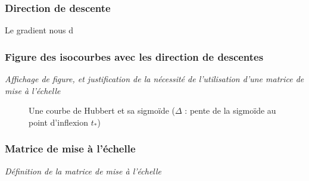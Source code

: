\documentclass{article}
\begin{document}
\subsubsection{Direction de descente}
Le gradient nous d



\subsubsection{Figure des isocourbes avec les direction de descentes}
\textit{Affichage de figure, et justification de la nécessité de l'utilisation d'une matrice de mise à l'échelle}

\begin{figure}[h]
	\centering
    \caption{Une courbe de Hubbert et sa sigmoïde ($\Delta$ : pente de la sigmoïde au point d'inflexion $t_*$) }
\end{figure}



\subsubsection{Matrice de mise à l'échelle}
\textit{Définition de la matrice de mise à l'échelle}
\end{document}
